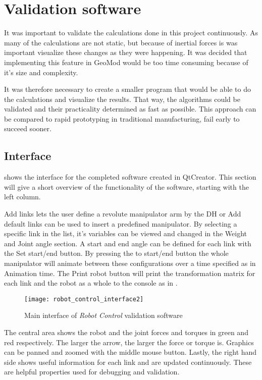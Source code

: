 \chapter{Validation software}

It was important to validate the calculations done in this project continuously. As many of the calculations are not static, but because of inertial forces is was important visualize these changes as they were happening. It was decided that implementing this feature in GeoMod would be too time consuming because of it's size and complexity. 

It was therefore necessary to create a smaller program that would be able to do the calculations and visualize the results. That way, the algorithms could be validated and their practicality determined as fast as possible. This approach can be compared to rapid prototyping in traditional manufacturing, fail early to succeed sooner.


\section{Interface}\label{interfaceSec}

 shows the interface for the completed software created in QtCreator. This section will give a short overview of the functionality of the software, starting with the left column.

\textsf{Add links} lets the user define a revolute manipulator arm by the \gls{DH} or \textsf{Add default links} can be used to insert a predefined manipulator. By selecting a specific link in the list, it's variables can be viewed and changed in the \textsf{Weight} and \textsf{Joint angle} section. A start and end angle can be defined for each link with the \textsf{Set start/end} button. By pressing the \textsf{to start/end} button the whole manipulator will animate between these configurations over a time specified as in \textsf{Animation time}. The \textsf{Print robot} button will print the transformation matrix for each link and the robot as a whole to the console as in .

\begin{figure}[h!]
    \centering
    \texttt{[image: robot\_control\_interface2]}
    \caption{Main interface of \textit{Robot Control} validation software}
    \label{interface}
\end{figure}

The central area shows the robot and the joint forces and torques in green and red respectively. The larger the arrow, the larger the force or torque is. Graphics can be panned and zoomed with the middle mouse button. Lastly, the right hand side shows useful information for each link and are updated continuously. These are helpful properties used for debugging and validation.

